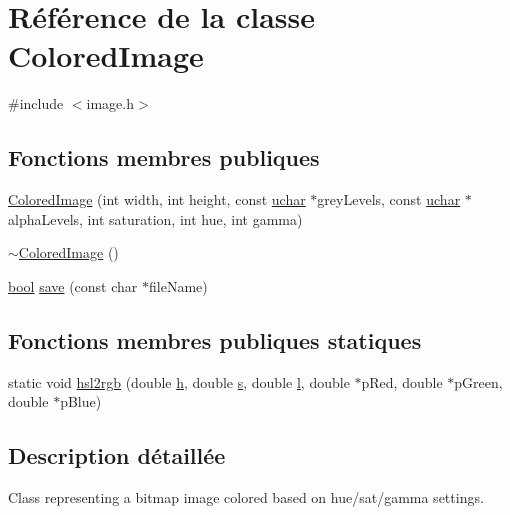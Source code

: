 \hypertarget{class_colored_image}{}\section{Référence de la classe Colored\+Image}
\label{class_colored_image}


{\ttfamily \#include $<$image.\+h$>$}

\subsection*{Fonctions membres publiques}
\begin{DoxyCompactItemize}
\item 
\hyperlink{class_colored_image_a4318459b9a275f2f6ff75ce76def2f95}{Colored\+Image} (int width, int height, const \hyperlink{qglobal_8h_a65f85814a8290f9797005d3b28e7e5fc}{uchar} $\ast$grey\+Levels, const \hyperlink{qglobal_8h_a65f85814a8290f9797005d3b28e7e5fc}{uchar} $\ast$alpha\+Levels, int saturation, int hue, int gamma)
\item 
\hyperlink{class_colored_image_a15d68911020c041ae76934d6e9bf4806}{$\sim$\+Colored\+Image} ()
\item 
\hyperlink{qglobal_8h_a1062901a7428fdd9c7f180f5e01ea056}{bool} \hyperlink{class_colored_image_a8b614204b1a682c84ab32aecbb3bf542}{save} (const char $\ast$file\+Name)
\end{DoxyCompactItemize}
\subsection*{Fonctions membres publiques statiques}
\begin{DoxyCompactItemize}
\item 
static void \hyperlink{class_colored_image_aa28cffecb75cf52b6b457178851704c5}{hsl2rgb} (double \hyperlink{060__command__switch_8tcl_af96fd0966e32a310a0778d2e5c357700}{h}, double \hyperlink{060__command__switch_8tcl_a011c73f2dbb87635a3b4206c72355f6e}{s}, double \hyperlink{060__command__switch_8tcl_aff56f84b49947b84b2a304f51cf8e678}{l}, double $\ast$p\+Red, double $\ast$p\+Green, double $\ast$p\+Blue)
\end{DoxyCompactItemize}


\subsection{Description détaillée}
Class representing a bitmap image colored based on hue/sat/gamma settings. 

